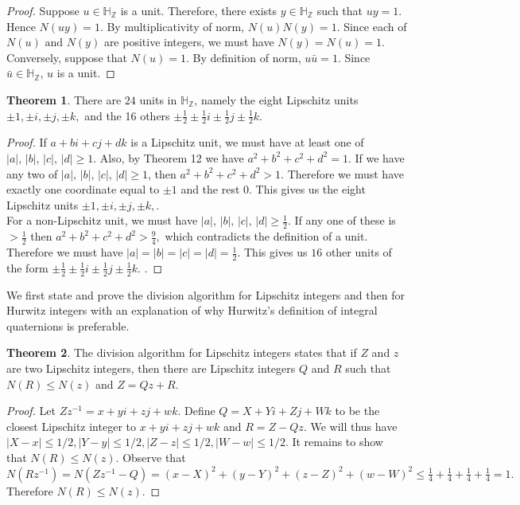 \documentclass[11pt]{report}
\theoremstyle{plain}
\theoremstyle{definition}
\newtheorem{theorem}{Theorem}
\begin{document}
\begin{proof}
	Suppose $ u \in \mathbb{H}_\mathbb{Z} $  is a unit. Therefore, there exists $ y \in \mathbb{H}_\mathbb{Z} $ such that $ uy = 1. $ Hence $ N(uy)=1. $ By multiplicativity of norm, $ N(u)N(y)=1. $ Since each of $ N(u) \text{ and }N(y) $ are positive integers, we must have $ N(y)=N(u)=1. $\\
	Conversely, suppose that $ N(u)=1 $. By definition of norm, $ u\bar{u}=1 $. Since $\bar{u} \in  \mathbb{H}_\mathbb{Z} $, $ u $ is a unit.
\end{proof}
\begin{theorem}
	There are $ 24 $ units in $ \mathbb{H}_\mathbb{Z} $, namely the eight Lipschitz units $ \pm 1, \pm i, \pm j, \pm k,$ and the 16 others $\pm \frac{1}{2} \pm \frac{1}{2}i \pm \frac{1}{2}j \pm \frac{1}{2}k. $ 
\end{theorem}
\begin{proof}
	If $ a+bi+cj+dk $ is a Lipschitz unit, we must have at least one of $|a|, \,|b|,\, |c|,\, |d| \geq 1. $ Also, by Theorem 12 we have $ a^2+b^2+c^2+d^2 = 1. $ If we have any two of $ |a|, \,|b|,\, |c|,\, |d| \geq 1 $, then $ a^2+b^2+c^2+d^2 > 1. $ Therefore we must have exactly one coordinate equal to $ \pm 1 $ and the rest $ 0. $ This gives us the eight Lipschitz units  $ \pm 1, \pm i, \pm j, \pm k,$.\\
	For a non-Lipschitz unit, we must have $ |a|, \,|b|,\, |c|,\, |d| \geq \frac{1}{2}. $ If any one of these is $ > \frac{1}{2} $ then $ a^2+b^2+c^2+d^2 > \frac{9}{4}, $ which contradicts the definition of a unit. Therefore we must have  $ |a| = |b| =  |c| =  |d| = \frac{1}{2}. $ This gives us $ 16 $ other units of the form $\pm \frac{1}{2} \pm \frac{1}{2}i \pm \frac{1}{2}j \pm \frac{1}{2}k. $ .
\end{proof}
We first state and prove the division algorithm for Lipschitz integers and then for Hurwitz integers with an explanation of why Hurwitz's definition of integral quaternions is preferable.
\begin{theorem}
	The division algorithm for Lipschitz integers states that if $ Z $ and $ z $ are two Lipschitz integers, then there are Lipschitz integers $ Q $ and $ R $ such that $ N(R)\leq N(z) $ and $ Z=Qz+R $.
\end{theorem}
	\begin{proof}
		Let $ Zz^{-1} = x + yi +zj+wk $. Define $ Q = X + Yi + Zj+ Wk $ to be the closest Lipschitz integer to $ x + yi +zj+wk $ and $ R = Z-Qz $. We will thus have $ |X-x|\leq 1/2 , |Y-y|\leq 1/2 , |Z-z|\leq 1/2,|W-w|\leq 1/2$. It remains to show that $ N(R)\leq N(z) $. Observe that $ N(Rz^{-1}) = N(Zz^{-1}-Q) = (x-X)^2+(y-Y)^2+(z-Z)^2+(w-W)^2 \leq \frac{1}{4} + \frac{1}{4} + \frac{1}{4}+ \frac{1}{4}= 1. $
		Therefore $ N(R)\leq  N(z) $. 
		
	\end{proof}
	
\end{document}
